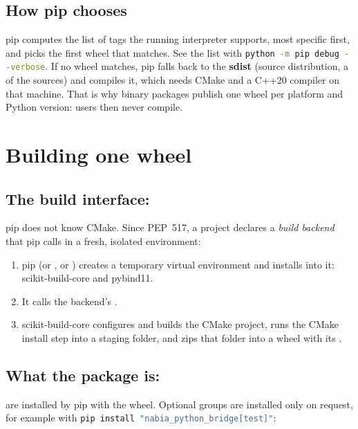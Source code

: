 \documentclass[11pt,a4paper]{article}
\newcommand{\filepiece}[3]{}
\newcommand{\cmd}{\lstinline[language=bash,basicstyle=\ttfamily\small]}
\begin{document}
\subsection{How pip chooses}
pip computes the list of tags the running interpreter supports, most specific first, and picks
the first wheel that matches. See the list with \cmd|python -m pip debug --verbose|. If no wheel
matches, pip falls back to the \textbf{sdist} (source distribution, a  of the
sources) and compiles it, which needs CMake and a C++20 compiler on that machine. That is why
binary packages publish one wheel per platform and Python version: users then never compile.

\section{Building one wheel}

\subsection{The build interface: \texorpdfstring{}{[build-system]}}
pip does not know CMake. Since PEP~517, a project declares a \emph{build backend} that pip calls
in a fresh, isolated environment:
\filepiece{pyproject-build-system}{toml}{\code{cpp/pyproject.toml}: which backend builds the wheel}
\begin{enumerate}
  \item pip (or , or ) creates a temporary virtual environment
        and installs  into it: scikit-build-core and pybind11.
  \item It calls the backend's .
  \item scikit-build-core configures and builds the CMake project, runs the CMake install step into
        a staging folder, and zips that folder into a wheel with its .
\end{enumerate}

\subsection{What the package is: \texorpdfstring{\code{[project]}}{[project]}}
\filepiece{pyproject-project}{toml}{\code{cpp/pyproject.toml}: package metadata (becomes \code{METADATA})}
 are installed by pip with the wheel. Optional groups are installed only on
request, for example with \cmd|pip install "nabia_python_bridge[test]"|:
\filepiece{pyproject-project-optional-dependencies}{toml}{\code{cpp/pyproject.toml}: optional dependency groups}
\end{document}
